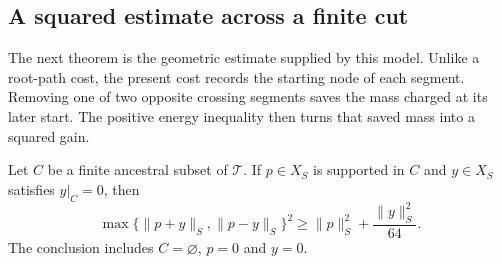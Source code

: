 \subsection{A squared estimate across a finite cut}

The next theorem is the geometric estimate supplied by this model.
Unlike a root-path cost, the present cost records the starting node of
each segment. Removing one of two opposite crossing segments saves
the mass charged at its later start. The positive energy
inequality then turns that saved mass into a squared gain.

\begin{theorem}\label{thm:segment-start-tail}
Let $C$ be a finite ancestral subset of $\mathcal T$. If $p\in X_S$ is
supported in $C$ and $y\in X_S$ satisfies $y|_C=0$, then
\begin{equation}\label{sm:s:tail}
 \max\{\|p+y\|_S,\|p-y\|_S\}^2
 \ge\|p\|_S^2+\frac{\|y\|_S^2}{64}.
\end{equation}
The conclusion includes $C=\varnothing$, $p=0$ and $y=0$.
\end{theorem}

